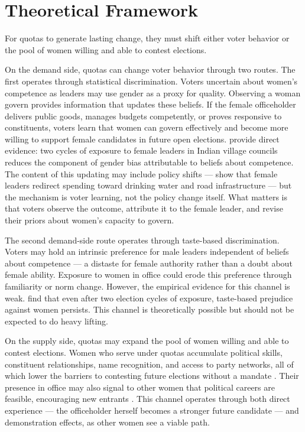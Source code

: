 \documentclass[12pt]{article}
\begin{document}
\section{Theoretical Framework}\label{sec:theory}
For quotas to generate lasting change, they must shift either voter behavior or the pool of women willing and able to contest elections.

On the demand side, quotas can change voter behavior through two routes. The first operates through statistical discrimination. Voters uncertain about women's competence as leaders may use gender as a proxy for quality. Observing a woman govern provides information that updates these beliefs. If the female officeholder delivers public goods, manages budgets competently, or proves responsive to constituents, voters learn that women can govern effectively and become more willing to support female candidates in future open elections. \citet{beaman2009powerful} provide direct evidence: two cycles of exposure to female leaders in Indian village councils reduces the component of gender bias attributable to beliefs about competence. The content of this updating may include policy shifts --- \citet{chattopadhyay2004women} show that female leaders redirect spending toward drinking water and road infrastructure --- but the mechanism is voter learning, not the policy change itself. What matters is that voters observe the outcome, attribute it to the female leader, and revise their priors about women's capacity to govern.

The second demand-side route operates through taste-based discrimination. Voters may hold an intrinsic preference for male leaders independent of beliefs about competence --- a distaste for female authority rather than a doubt about female ability. Exposure to women in office could erode this preference through familiarity or norm change. However, the empirical evidence for this channel is weak. \citet{beaman2009powerful} find that even after two election cycles of exposure, taste-based prejudice against women persists. This channel is theoretically possible but should not be expected to do heavy lifting.

On the supply side, quotas may expand the pool of women willing and able to contest elections. Women who serve under quotas accumulate political skills, constituent relationships, name recognition, and access to party networks, all of which lower the barriers to contesting future elections without a mandate \citep{barnes2020gender, goyal2025local}. Their presence in office may also signal to other women that political careers are feasible, encouraging new entrants \citep{beaman2012female, prillaman2023strength}. This channel operates through both direct experience --- the officeholder herself becomes a stronger future candidate --- and demonstration effects, as other women see a viable path.
\end{document}
